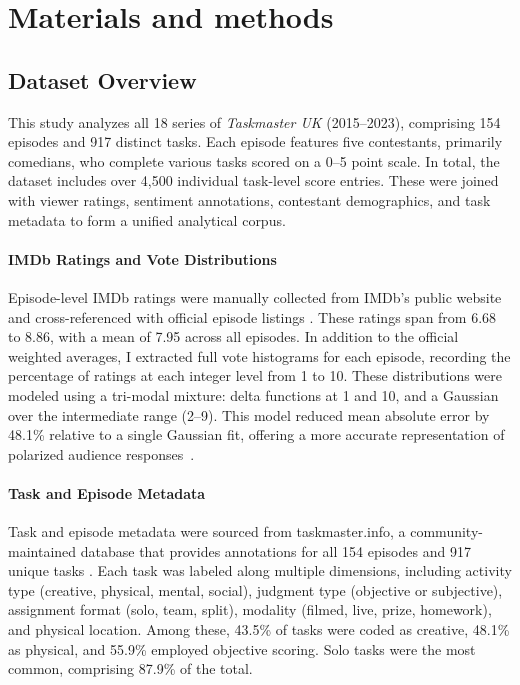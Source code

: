 \documentclass[10pt,letterpaper]{article}
\begin{document}

\section*{Materials and methods}


\subsection*{Dataset Overview}

This study analyzes all 18 series of \textit{Taskmaster UK} (2015–2023), comprising 154 episodes and 917 distinct tasks. Each episode features five contestants, primarily comedians, who complete various tasks scored on a 0–5 point scale. In total, the dataset includes over 4,500 individual task-level score entries. These were joined with viewer ratings, sentiment annotations, contestant demographics, and task metadata to form a unified analytical corpus.

\paragraph{IMDb Ratings and Vote Distributions}
Episode-level IMDb ratings were manually collected from IMDb’s public website and cross-referenced with official episode listings \cite{imdb}. These ratings span from 6.68 to 8.86, with a mean of 7.95 across all episodes. In addition to the official weighted averages, I extracted full vote histograms for each episode, recording the percentage of ratings at each integer level from 1 to 10. These distributions were modeled using a tri-modal mixture: delta functions at 1 and 10, and a Gaussian over the intermediate range (2–9). This model reduced mean absolute error by 48.1\% relative to a single Gaussian fit, offering a more accurate representation of polarized audience responses~\cite{McLachlan2000}.

\paragraph{Task and Episode Metadata}
Task and episode metadata were sourced from taskmaster.info, a community-maintained database that provides annotations for all 154 episodes and 917 unique tasks \cite{taskmasterinfo}. Each task was labeled along multiple dimensions, including activity type (creative, physical, mental, social), judgment type (objective or subjective), assignment format (solo, team, split), modality (filmed, live, prize, homework), and physical location. Among these, 43.5\% of tasks were coded as creative, 48.1\% as physical, and 55.9\% employed objective scoring. Solo tasks were the most common, comprising 87.9\% of the total.
\end{document}
